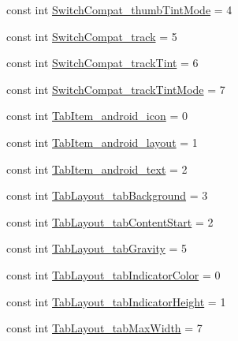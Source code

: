 \begin{DoxyCompactItemize}
\item 
const int \mbox{\hyperlink{class_f_w_p_s___app_1_1_droid_1_1_resource_1_1_styleable_a859c1d407789e96feff1b4cf24a45ee8}{Switch\+Compat\+\_\+thumb\+Tint\+Mode}} = 4
\item 
const int \mbox{\hyperlink{class_f_w_p_s___app_1_1_droid_1_1_resource_1_1_styleable_a790ca267a94e5c0885048aff12cedbc4}{Switch\+Compat\+\_\+track}} = 5
\item 
const int \mbox{\hyperlink{class_f_w_p_s___app_1_1_droid_1_1_resource_1_1_styleable_a53e145a874568aa691a6edc42430459a}{Switch\+Compat\+\_\+track\+Tint}} = 6
\item 
const int \mbox{\hyperlink{class_f_w_p_s___app_1_1_droid_1_1_resource_1_1_styleable_ae9017cf88a12ac65764e4a8d41dffb02}{Switch\+Compat\+\_\+track\+Tint\+Mode}} = 7
\item 
const int \mbox{\hyperlink{class_f_w_p_s___app_1_1_droid_1_1_resource_1_1_styleable_ab38b5b57259d8204dfb3e06b4527a5c2}{Tab\+Item\+\_\+android\+\_\+icon}} = 0
\item 
const int \mbox{\hyperlink{class_f_w_p_s___app_1_1_droid_1_1_resource_1_1_styleable_a23af4eeefcf8b494ff6cf850583fca20}{Tab\+Item\+\_\+android\+\_\+layout}} = 1
\item 
const int \mbox{\hyperlink{class_f_w_p_s___app_1_1_droid_1_1_resource_1_1_styleable_a59a8cc4b190dc369ae38993ebd419b14}{Tab\+Item\+\_\+android\+\_\+text}} = 2
\item 
const int \mbox{\hyperlink{class_f_w_p_s___app_1_1_droid_1_1_resource_1_1_styleable_a69b264332031785377848698c07865d4}{Tab\+Layout\+\_\+tab\+Background}} = 3
\item 
const int \mbox{\hyperlink{class_f_w_p_s___app_1_1_droid_1_1_resource_1_1_styleable_a8ad159e79b00cef6166997610b0edb8a}{Tab\+Layout\+\_\+tab\+Content\+Start}} = 2
\item 
const int \mbox{\hyperlink{class_f_w_p_s___app_1_1_droid_1_1_resource_1_1_styleable_a18290f73ae20379765de1159aa56a632}{Tab\+Layout\+\_\+tab\+Gravity}} = 5
\item 
const int \mbox{\hyperlink{class_f_w_p_s___app_1_1_droid_1_1_resource_1_1_styleable_a90aa73378b0e51a8d282ee0cab60f3ab}{Tab\+Layout\+\_\+tab\+Indicator\+Color}} = 0
\item 
const int \mbox{\hyperlink{class_f_w_p_s___app_1_1_droid_1_1_resource_1_1_styleable_a5b3dd59a9732d390ab6e59ecf5f22475}{Tab\+Layout\+\_\+tab\+Indicator\+Height}} = 1
\item 
const int \mbox{\hyperlink{class_f_w_p_s___app_1_1_droid_1_1_resource_1_1_styleable_adeb429acaa42117cbf925e2656e5a4bf}{Tab\+Layout\+\_\+tab\+Max\+Width}} = 7

\end{DoxyCompactItemize}
